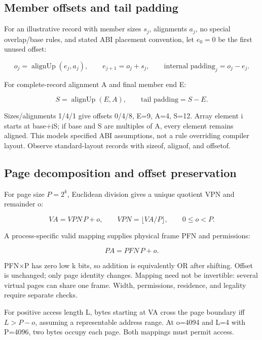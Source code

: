 \subsection{Member offsets and tail padding}\label{01-foundations-i-ch011-member-offsets-and-tail-padding}

\hypertarget{01-foundations-i-ch011-member-offsets-and-tail-padding}{}

For an illustrative record with member sizes \(s_j\), alignments \(a_j\), no special overlap/base rules, and stated ABI placement convention, let \(e_0=0\) be the first unused offset:

\[
o_j=\operatorname{alignUp}(e_j,a_j),\qquad
e_{j+1}=o_j+s_j,\qquad
\text{internal padding}_j=o_j-e_j.
\]

For complete-record alignment A and final member end E:

\[
S=\operatorname{alignUp}(E,A),\qquad
\text{tail padding}=S-E.
\]

Sizes/alignments 1/4/1 give offsets 0/4/8, E=9, A=4, S=12. Array element i starts at base+iS; if base and S are multiples of A, every element remains aligned. This models specified ABI assumptions, not a rule overriding compiler layout. Observe standard-layout records with sizeof, alignof, and offsetof.

\subsection{Page decomposition and offset preservation}\label{01-foundations-i-ch011-page-decomposition-and-offset-preservation}

\hypertarget{01-foundations-i-ch011-page-decomposition-and-offset-preservation}{}

For page size \(P=2^k\), Euclidean division gives a unique quotient VPN and remainder o:

\[
VA=VPN\,P+o,\qquad VPN=\lfloor VA/P\rfloor,\qquad 0\le o<P.
\]

A process-specific valid mapping supplies physical frame PFN and permissions:

\[
PA=PFN\,P+o.
\]

PFN×P has zero low k bits, so addition is equivalently OR after shifting. Offset is unchanged; only page identity changes. Mapping need not be invertible: several virtual pages can share one frame. Width, permissions, residence, and legality require separate checks.

For positive access length L, bytes starting at VA cross the page boundary iff \(L>P-o\), assuming a representable address range. At o=4094 and L=4 with P=4096, two bytes occupy each page. Both mappings must permit access.

